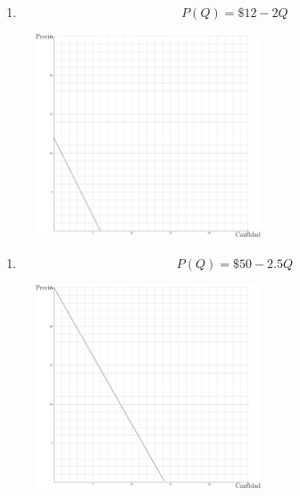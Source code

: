 \documentclass[
  letterpaper,
  DIV=11,
  numbers=noendperiod]{scrreport}
\providecommand{\tightlist}{%
  \setlength{\itemsep}{0pt}\setlength{\parskip}{0pt}}\usepackage{longtable,booktabs,array}
\begin{document}
\newpage

\begin{enumerate}
\def\labelenumi{\arabic{enumi})}
\setcounter{enumi}{1}
\tightlist
\item
  \[
  P(Q)=\$12 - 2Q
  \]
\end{enumerate}

\begin{figure}

{\centering \includegraphics[width=0.6\textwidth,height=\textheight]{8ej_pauta_files/figure-pdf/unnamed-chunk-4-1.pdf}

}

\end{figure}

\newpage

\begin{enumerate}
\def\labelenumi{\arabic{enumi})}
\setcounter{enumi}{2}
\tightlist
\item
  \[
  P(Q)=\$50 - 2.5Q
  \]
\end{enumerate}

\begin{figure}

{\centering \includegraphics[width=0.6\textwidth,height=\textheight]{8ej_pauta_files/figure-pdf/unnamed-chunk-5-1.pdf}

}

\end{figure}
\end{document}
